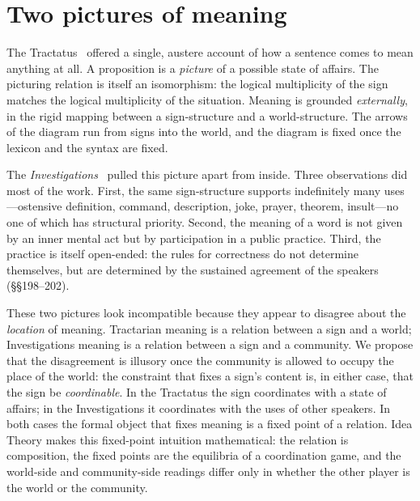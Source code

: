 \section{Two pictures of meaning}\label{sec:two-pictures}

The Tractatus~\cite{Wittgenstein1922} offered a single, austere account
of how a sentence comes to mean anything at all. A proposition is a
\emph{picture} of a possible state of affairs. The picturing relation is
itself an isomorphism: the logical multiplicity of the sign matches the
logical multiplicity of the situation. Meaning is grounded
\emph{externally}, in the rigid mapping between a sign-structure and a
world-structure. The arrows of the diagram run from signs into the
world, and the diagram is fixed once the lexicon and the syntax are
fixed.

The \emph{Investigations}~\cite{Wittgenstein1953} pulled this picture
apart from inside. Three observations did most of the work. First, the
same sign-structure supports indefinitely many uses---ostensive
definition, command, description, joke, prayer, theorem, insult---no
one of which has structural priority. Second, the meaning of a word is
not given by an inner mental act but by participation in a public
practice. Third, the practice is itself open-ended: the rules for
correctness do not determine themselves, but are determined by the
sustained agreement of the speakers (\S\S198--202).

These two pictures look incompatible because they appear to disagree
about the \emph{location} of meaning. Tractarian meaning is a relation
between a sign and a world; Investigations meaning is a relation between
a sign and a community. We propose that the disagreement is illusory once
the community is allowed to occupy the place of the world: the
constraint that fixes a sign's content is, in either case, that the
sign be \emph{coordinable}. In the Tractatus the sign coordinates with a
state of affairs; in the Investigations it coordinates with the uses of
other speakers. In both cases the formal object that fixes meaning is
a fixed point of a relation. Idea Theory makes this fixed-point
intuition mathematical: the relation is composition, the fixed points
are the equilibria of a coordination game, and the world-side and
community-side readings differ only in whether the other player is the
world or the community.

